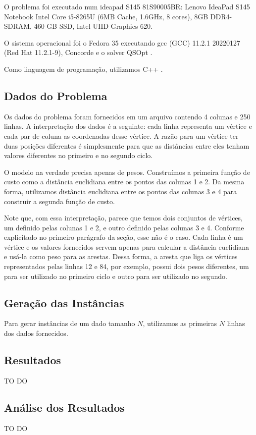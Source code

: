 \documentclass{article}
\begin{document}
O problema foi executado num ideapad S145 81S90005BR: Lenovo IdeaPad S145 Notebook Intel Core i5-8265U (6MB Cache, 1.6GHz, 8 cores), 8GB DDR4-SDRAM, 460 GB SSD, Intel UHD Graphics 620.

O sistema operacional foi o Fedora 35 executando gcc (GCC) 11.2.1 20220127 (Red Hat 11.2.1-9), Concorde \cite{bib:concorde} e o solver QSOpt \cite{bib:qsopt}.

Como linguagem de programação, utilizamos C++ \cite{bib:cpp}.


\subsection{Dados do Problema}

Os dados do problema foram fornecidos em um arquivo contendo 4 colunas e 250 linhas. A interpretação dos dados é a seguinte: cada linha representa um vértice e cada par de coluna as coordenadas desse vértice. A razão para um vértice ter duas posições diferentes é simplesmente para que as distâncias entre eles tenham valores diferentes no primeiro e no segundo ciclo.

O modelo na verdade precisa apenas de pesos. Construímos a primeira função de custo como a distância euclidiana entre os pontos das colunas 1 e 2. Da mesma forma, utilizamos distância euclidiana entre os pontos das colunas 3 e 4 para construir a segunda função de custo.

Note que, com essa interpretação, parece que temos dois conjuntos de vértices, um definido pelas colunas 1 e 2, e outro definido pelas colunas 3 e 4. Conforme explicitado no primeiro parágrafo da seção, esse não é o caso. Cada linha é um vértice e os valores fornecidos servem apenas para calcular a distância euclidiana e usá-la como peso para as arestas. Dessa forma, a aresta que liga os vértices representados pelas linhas 12 e 84, por exemplo, possui dois pesos diferentes, um para ser utilizado no primeiro ciclo e outro para ser utilizado no segundo.

\subsection{Geração das Instâncias}

Para gerar instâncias de um dado tamanho $N$, utilizamos as primeiras $N$ linhas dos dados fornecidos.

\subsection{Resultados}

{\huge TO DO}

\subsection{Análise dos Resultados}

{\huge TO DO}



\end{document}
